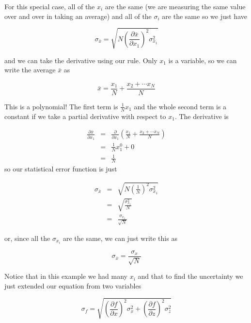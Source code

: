 For this special case, all of the $x_{i}$ are the same (we are measuring the same value over and over in taking an average) and all of the $\sigma _{i}$ are the same so we just have

\begin{equation*}
	\sigma _{\bar{x}}=\sqrt{N\left( \frac{\partial \bar{x}}{\partial x_{1}} \right) ^{2}\sigma _{x_{1}}^{2}}
\end{equation*}

and we can take the derivative using our rule. Only $x_{1}$ is a variable, so we can write the average $\bar{x}$ as 

\begin{equation*}
	\bar{x}=\frac{x_{1}}{N}+\frac{x_{2}+\cdots x_{N}}{N}
\end{equation*}

This is a polynomial! The first term is $\frac{1}{N}x_{1}$ and the whole second term is a constant if we take a partial derivative with respect to $x_{1}$. The derivative is 

\begin{eqnarray*}
	\frac{\partial \bar{x}}{\partial x_{1}} &=&\frac{\partial }{\partial x_{1}}\left( \frac{x_{1}}{N}+\frac{x_{2}+\cdots x_{N}}{N}\right) \\
                                            &=&\frac{1}{N}x_{1}^{0}+0 \\
                                            &=&\frac{1}{N}
\end{eqnarray*}
so our statistical error function is just 

\begin{eqnarray*}
	\sigma _{\bar{x}} &=&\sqrt{N\left( \frac{1}{N}\right) ^{2}\sigma _{x_{1}}^{2}} \\
                      &=&\sqrt{\frac{\sigma _{x_{1}}^{2}}{N}} \\
                      &=&\frac{\sigma _{x_{1}}}{\sqrt{N}}
\end{eqnarray*}

or, since all the $\sigma _{x_{i}}$ are the same, we can just write this as 

\begin{equation*}
	\sigma _{\bar{x}}=\frac{\sigma _{x}}{\sqrt{N}}
\end{equation*}

Notice that in this example we had many $x_{i}$ and that to find the uncertainty we just extended our equation from two variables

\begin{equation*}
	\sigma _{f}=\sqrt{\left( \frac{\partial f}{\partial x}\right) ^{2}\sigma_{x}^{2}+\left( \frac{\partial f}{\partial z}\right) ^{2}\sigma _{z}^{2}}
\end{equation*}

